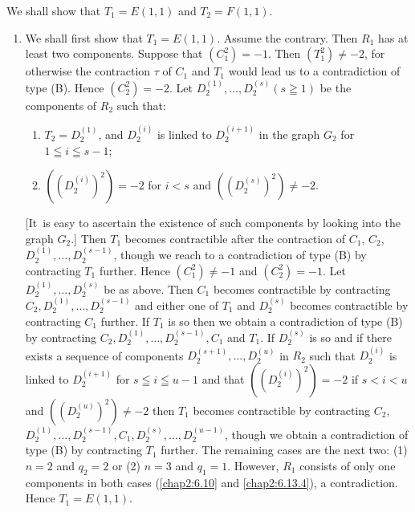 We shall show that $T_{1}=E(1,1)$ and $T_{2}=F(1,1)$.
\begin{enumerate}
\renewcommand{\theenumi}{\Roman{enumi}}
\renewcommand{\labelenumi}{(\theenumi)}
\item We shall first show that $T_{1}=E(1,1)$. Assume the
  contrary. Then $R_{1}$ has at least two components. Suppose that
  $(C^{2}_{1})=-1$. Then $(T^{2}_{1})\neq -2$, for otherwise the
  contraction $\tau$ of $C_{1}$ and $T_{1}$ would lead us to a
  contradiction of type (B). Hence $(C^{2}_{2})=-2$. Let
  $D^{(1)}_{2},\ldots,D^{(s)}_{2}(s\geqq 1)$ be the components of
  $R_{2}$ such that:
\begin{enumerate}
\renewcommand{\theenumii}{\arabic{enumii}}
\renewcommand{\labelenumii}{\rm(\theenumii)}
\item $T_{2}=D^{(1)}_{2}$, and $D^{(i)}_{2}$ is linked to
  $D^{(i+1)}_{2}$ in the graph $G_{2}$ for $1\leqq i\leqq s-1$;

\item $((D^{(i)}_{2})^{2})=-2$ for $i<s$ and $((D^{(s)}_{2})^{2})\neq -2$.
\end{enumerate}
[It\pageoriginale\ is easy to ascertain the existence of such
  components by looking into the graph $G_{2}$.] Then $T_{1}$ becomes
contractible after the contraction of $C_{1}$, $C_{2}$,
$D^{(1)}_{2},\ldots,D_{2}^{(s-1)}$, though we reach to a contradiction
of type (B) by contracting $T_{1}$ further. Hence $(C^{2}_{1})\neq -1$
and $(C^{2}_{2})=-1$. Let $D^{(1)}_{2},\ldots,D^{(s)}_{2}$ be as
above. Then $C_{1}$ becomes contractible by contracting
$C_{2},D^{(1)}_{2},\ldots,D^{(s-1)}_{2}$ and either one of $T_{1}$ and
$D^{(s)}_{2}$ becomes contractible by contracting $C_{1}$ further. If
$T_{1}$ is so then we obtain a contradiction of type (B) by
contracting $C_{2},D^{(1)}_{2},\ldots,D^{(s-1)}_{2},C_{1}$ and
$T_{1}$. If $D^{(s)}_{2}$ is so and if there exists a sequence of
components $D^{(s+1)}_{2},\ldots,D^{(u)}_{2}$ in $R_{2}$ such that
$D^{(i)}_{2}$ is linked to $D^{(i+1)}_{2}$ for $s\leqq i\leqq u-1$ and
that $((D^{(i)}_{2})^{2})=-2$ if $s<i<u$ and $((D^{(u)}_{2})^{2})\neq
-2$ then $T_{1}$ becomes contractible by contracting $C_{2}$,
$D^{(1)}_{2},\ldots,D_{2}^{(s-1)},C_{1},D^{(s)}_{2},\ldots,D_{2}^{(u-1)}$,
though we obtain a contradiction of type (B) by contracting $T_{1}$
further. The remaining cases are the next two: (1) $n=2$ and $q_{2}=2$
or (2) $n=3$ and $q_{1}=1$. However, $R_{1}$ consists of only one
components in both cases (\cf \ref{chap2:6.10} and \ref{chap2:6.13.4}), a
contradiction. Hence $T_{1}=E(1,1)$.


\end{enumerate}
